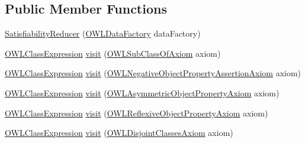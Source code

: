 \subsection*{Public Member Functions}
\begin{DoxyCompactItemize}
\item 
\hyperlink{classorg_1_1semanticweb_1_1owlapi_1_1reasoner_1_1impl_1_1_satisfiability_reducer_a914de076b600b603fe18cbe73c085bf4}{Satisfiability\-Reducer} (\hyperlink{interfaceorg_1_1semanticweb_1_1owlapi_1_1model_1_1_o_w_l_data_factory}{O\-W\-L\-Data\-Factory} data\-Factory)
\item 
\hyperlink{interfaceorg_1_1semanticweb_1_1owlapi_1_1model_1_1_o_w_l_class_expression}{O\-W\-L\-Class\-Expression} \hyperlink{classorg_1_1semanticweb_1_1owlapi_1_1reasoner_1_1impl_1_1_satisfiability_reducer_af165dae8de1a79e176f06b4710a3e96a}{visit} (\hyperlink{interfaceorg_1_1semanticweb_1_1owlapi_1_1model_1_1_o_w_l_sub_class_of_axiom}{O\-W\-L\-Sub\-Class\-Of\-Axiom} axiom)
\item 
\hyperlink{interfaceorg_1_1semanticweb_1_1owlapi_1_1model_1_1_o_w_l_class_expression}{O\-W\-L\-Class\-Expression} \hyperlink{classorg_1_1semanticweb_1_1owlapi_1_1reasoner_1_1impl_1_1_satisfiability_reducer_a1dd3d5896a38669f1c8b0b09fb44095d}{visit} (\hyperlink{interfaceorg_1_1semanticweb_1_1owlapi_1_1model_1_1_o_w_l_negative_object_property_assertion_axiom}{O\-W\-L\-Negative\-Object\-Property\-Assertion\-Axiom} axiom)
\item 
\hyperlink{interfaceorg_1_1semanticweb_1_1owlapi_1_1model_1_1_o_w_l_class_expression}{O\-W\-L\-Class\-Expression} \hyperlink{classorg_1_1semanticweb_1_1owlapi_1_1reasoner_1_1impl_1_1_satisfiability_reducer_a36f136d63dfb5a5439b5f2c0e2d98128}{visit} (\hyperlink{interfaceorg_1_1semanticweb_1_1owlapi_1_1model_1_1_o_w_l_asymmetric_object_property_axiom}{O\-W\-L\-Asymmetric\-Object\-Property\-Axiom} axiom)
\item 
\hyperlink{interfaceorg_1_1semanticweb_1_1owlapi_1_1model_1_1_o_w_l_class_expression}{O\-W\-L\-Class\-Expression} \hyperlink{classorg_1_1semanticweb_1_1owlapi_1_1reasoner_1_1impl_1_1_satisfiability_reducer_aa3f079085942413348693c4f00ab52c0}{visit} (\hyperlink{interfaceorg_1_1semanticweb_1_1owlapi_1_1model_1_1_o_w_l_reflexive_object_property_axiom}{O\-W\-L\-Reflexive\-Object\-Property\-Axiom} axiom)
\item 
\hyperlink{interfaceorg_1_1semanticweb_1_1owlapi_1_1model_1_1_o_w_l_class_expression}{O\-W\-L\-Class\-Expression} \hyperlink{classorg_1_1semanticweb_1_1owlapi_1_1reasoner_1_1impl_1_1_satisfiability_reducer_a7c99dbf0348960170d344ae57d9007f0}{visit} (\hyperlink{interfaceorg_1_1semanticweb_1_1owlapi_1_1model_1_1_o_w_l_disjoint_classes_axiom}{O\-W\-L\-Disjoint\-Classes\-Axiom} axiom)

\end{DoxyCompactItemize}
